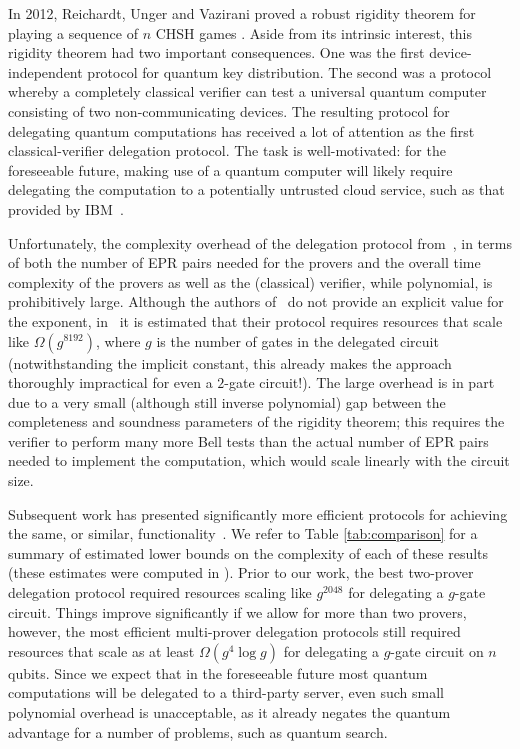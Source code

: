 In 2012, Reichardt, Unger and Vazirani proved a robust rigidity theorem for
playing a sequence of $n$ CHSH games \cite{reichardt2012classical}. Aside from
its intrinsic interest, this rigidity theorem had two important consequences.
One was the first device-independent protocol for quantum key distribution. The
second was a protocol whereby a completely classical verifier can test a
universal quantum computer consisting of two non-communicating devices.  The resulting
 protocol for delegating quantum
computations has received a lot of attention as the first classical-verifier delegation protocol. 
The task is well-motivated: for the foreseeable future, making use of a quantum computer will likely require delegating the computation to a potentially untrusted cloud service, such as that provided by IBM~\cite{ibmcloud}.  

Unfortunately, the complexity overhead of the delegation protocol from~\cite{reichardt2012classical}, in terms of both the number of EPR pairs needed for the provers and the overall time complexity of the provers as well as the (classical) verifier, while polynomial, is prohibitively large. Although the authors of~\cite{reichardt2012classical} do not provide an explicit value for the exponent, in~\cite{hajdusek2015} it is estimated that their protocol requires resources that scale like $\Omega(g^{8192})$, where $g$ is the number of gates in the delegated circuit (notwithstanding the implicit constant, this already makes the approach thoroughly impractical for even a $2$-gate circuit!).
The large overhead is in part due to a very small (although still inverse polynomial) gap between the completeness and soundness parameters of the rigidity theorem; this requires the verifier to perform many more Bell tests than the actual number of EPR pairs needed to implement the computation, which would scale linearly with the circuit size. 

Subsequent work has presented significantly more efficient protocols for achieving the same, or similar,  functionality~\cite{McKague16,Gheorghiu15,hajdusek2015}. We refer to Table \ref{tab:comparison}
for a summary of estimated lower bounds on the complexity of each of these
results (these estimates were computed in \cite{hajdusek2015}). Prior to our
work, the best two-prover delegation protocol required resources scaling like
$g^{2048}$ for delegating a $g$-gate circuit. Things improve significantly if we
allow for more than two provers, however, the most efficient multi-prover
delegation protocols still required resources that scale
as at least $\Omega(g^4\log{g})$ for delegating a $g$-gate circuit on $n$ qubits.
Since we expect that in the foreseeable future most quantum computations will be delegated to a third-party server, even such small polynomial overhead is unacceptable, as it already negates the quantum advantage for a number of problems, such as quantum search.

